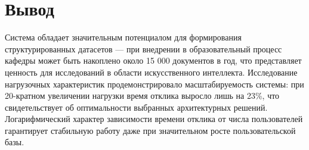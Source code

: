 \section*{Вывод}

Система обладает значительным потенциалом для формирования структурированных датасетов — при внедрении в образовательный процесс кафедры может быть накоплено около 15 000 документов в год, что представляет ценность для исследований в области искусственного интеллекта. 
Исследование нагрузочных характеристик продемонстрировало масштабируемость системы: при 20-кратном увеличении нагрузки время отклика выросло лишь на 23\%, что свидетельствует об оптимальности выбранных архитектурных решений. 
Логарифмический характер зависимости времени отклика от числа пользователей гарантирует стабильную работу даже при значительном росте пользовательской базы.